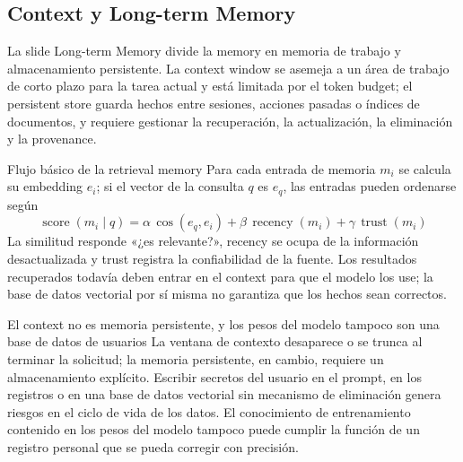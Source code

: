 \subsection{Context y Long-term Memory}

La slide Long-term Memory divide la memory en memoria de trabajo y almacenamiento persistente. La context window se asemeja a un área de trabajo de corto plazo para la tarea actual y está limitada por el token budget; el persistent store guarda hechos entre sesiones, acciones pasadas o índices de documentos, y requiere gestionar la recuperación, la actualización, la eliminación y la provenance.


\begin{importantbox}{Flujo básico de la retrieval memory}
Para cada entrada de memoria $m_i$ se calcula su embedding $e_i$; si el vector de la consulta $q$ es $e_q$, las entradas pueden ordenarse según
\[
\operatorname{score}(m_i\mid q)
=\alpha\,\cos(e_q,e_i)
+\beta\,\operatorname{recency}(m_i)
+\gamma\,\operatorname{trust}(m_i)
\]
La similitud responde «¿es relevante?», recency se ocupa de la información desactualizada y trust registra la confiabilidad de la fuente. Los resultados recuperados todavía deben entrar en el context para que el modelo los use; la base de datos vectorial por sí misma no garantiza que los hechos sean correctos.
\end{importantbox}

\begin{warningbox}{El context no es memoria persistente, y los pesos del modelo tampoco son una base de datos de usuarios}
La ventana de contexto desaparece o se trunca al terminar la solicitud; la memoria persistente, en cambio, requiere un almacenamiento explícito. Escribir secretos del usuario en el prompt, en los registros o en una base de datos vectorial sin mecanismo de eliminación genera riesgos en el ciclo de vida de los datos. El conocimiento de entrenamiento contenido en los pesos del modelo tampoco puede cumplir la función de un registro personal que se pueda corregir con precisión.
\end{warningbox}


